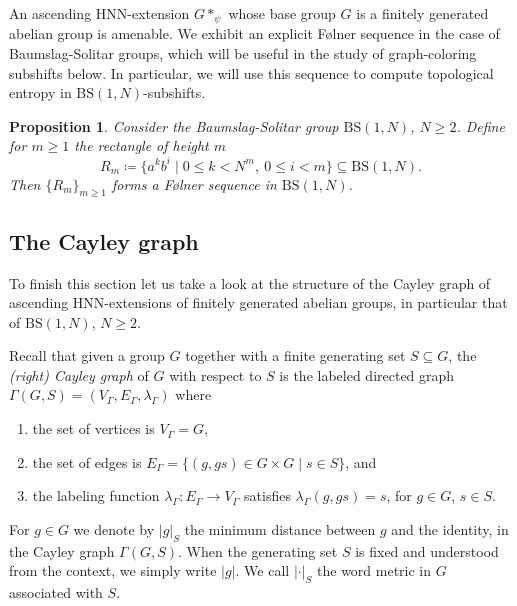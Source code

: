 \documentclass[letterpaper,11pt,reqno]{amsart}
\theoremstyle{plain}
\newtheorem{proposition}[theorem]{Proposition}
\theoremstyle{definition}
\newcommand{\BS}[1][N]{\mathrm{BS}(1,#1)}
\begin{document}
An ascending HNN-extension $G*_{\psi}$ whose base group $G$ is a finitely generated abelian group is amenable. We exhibit an explicit F\o lner sequence in the case of Baumslag-Solitar groups, which will be useful in the study of graph-coloring subshifts below. In particular, we will use this sequence to compute topological entropy in $\BS$-subshifts.


\begin{proposition}\label{prop:rectangles_and_folner} Consider the Baumslag-Solitar group $\BS$, $N\ge 2$. Define for $m\ge 1$ the \textit{rectangle of height $m$}
	$$
	R_m\coloneqq \{a^kb^i\mid 0\le k<N^m, \ 0\le i<m  \}\subseteq \BS.
	$$
	Then $\{R_m\}_{m\ge 1}$ forms a F\o lner sequence in $\BS$.
\end{proposition}




\subsection{The Cayley graph }\label{subsection:Cayley}

To finish this section let us take a look at the structure of the Cayley graph of ascending HNN-extensions of finitely generated abelian groups, in particular that of $\BS$, $N\ge 2$. 

Recall that given a group $G$ together with a finite generating set $S\subseteq G$, the \textit{(right) Cayley graph} of $G$ with respect to $S$ is the labeled directed graph  $\Gamma(G,S)=(V_{\Gamma},E_{\Gamma},\lambda_{\Gamma})$ where
\begin{enumerate}
	\item the set of vertices is $V_\Gamma=G$, 
	\item the set of edges is $E_{\Gamma}=\{(g,gs)\in G\times G\mid s\in S\}$, and
	\item the labeling function $\lambda_{\Gamma}:E_{\Gamma}\to V_{\Gamma}$ satisfies $\lambda_{\Gamma}(g,gs)=s$, for $g\in G$, $s\in S$.
\end{enumerate}
For $g\in G$ we denote by $|g|_S$ the minimum distance between $g$ and the identity, in the Cayley graph $\Gamma(G,S)$. When the generating set $S$ is fixed and understood from the context, we simply write $|g|$. We call $|\cdot|_S$ the word metric in $G$ associated with $S$.
\end{document}
